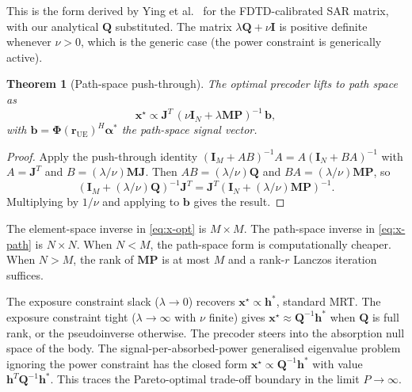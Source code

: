 \documentclass[journal,twocolumn,10pt]{IEEEtran}
\theoremstyle{plain}
\newtheorem{theorem}{Theorem}
\theoremstyle{remark}
\newcommand{\rr}{\mathbf{r}}
\newcommand{\xx}{\mathbf{x}}
\newcommand{\hh}{\mathbf{h}}
\newcommand{\bvec}{\mathbf{b}}
\newcommand{\Qmat}{\mathbf{Q}}
\newcommand{\Mmat}{\mathbf{M}}
\newcommand{\Jmat}{\mathbf{J}}
\newcommand{\Pmat}{\mathbf{P}}
\newcommand{\Phimat}{\mathbf{\Phi}}
\begin{document}
This is the form derived by Ying et al.~\cite{Ying2015} for the
FDTD-calibrated SAR matrix, with our analytical $\Qmat$
substituted. The matrix $\lambda \Qmat + \nu \mathbf{I}$ is positive
definite whenever $\nu > 0$, which is the generic case (the power
constraint is generically active).

\begin{theorem}[Path-space push-through]\label{thm:push-through}
The optimal precoder lifts to path space as
\begin{equation}\label{eq:x-path}
  \xx^\star \propto \Jmat^T\,
  (\nu \mathbf{I}_N + \lambda \Mmat \Pmat)^{-1}\,\bvec,
\end{equation}
with $\bvec = \Phimat(\rr_{\mathrm{UE}})^H \bm\alpha^*$ the
path-space signal vector.
\end{theorem}

\begin{proof}
Apply the push-through identity $(\mathbf{I}_M + AB)^{-1} A = A
(\mathbf{I}_N + BA)^{-1}$ with $A = \Jmat^T$ and $B = (\lambda/\nu)
\Mmat \Jmat$. Then $AB = (\lambda/\nu) \Qmat$ and $BA = (\lambda/\nu)
\Mmat \Pmat$, so
\begin{equation*}
  (\mathbf{I}_M + (\lambda/\nu) \Qmat)^{-1} \Jmat^T
  = \Jmat^T (\mathbf{I}_N + (\lambda/\nu) \Mmat \Pmat)^{-1}.
\end{equation*}
Multiplying by $1/\nu$ and applying to $\bvec$ gives the result.
\end{proof}

The element-space inverse in \cref{eq:x-opt} is $M \times M$. The
path-space inverse in \cref{eq:x-path} is $N \times N$. When
$N < M$, the path-space form is computationally cheaper. When
$N > M$, the rank of $\Mmat \Pmat$ is at most $M$ and a rank-$r$
Lanczos iteration suffices.

The exposure constraint slack ($\lambda \to 0$) recovers
$\xx^\star \propto \hh^*$, standard MRT. The exposure constraint
tight ($\lambda \to \infty$ with $\nu$ finite) gives
$\xx^\star \approx \Qmat^{-1} \hh^*$ when $\Qmat$ is full rank, or
the pseudoinverse otherwise. The precoder steers into the absorption
null space of the body. The signal-per-absorbed-power generalised
eigenvalue problem ignoring the power constraint has the closed
form $\xx^\star \propto \Qmat^{-1} \hh^*$ with value
$\hh^T \Qmat^{-1} \hh^*$. This traces the Pareto-optimal trade-off
boundary in the limit $P \to \infty$.
\end{document}

